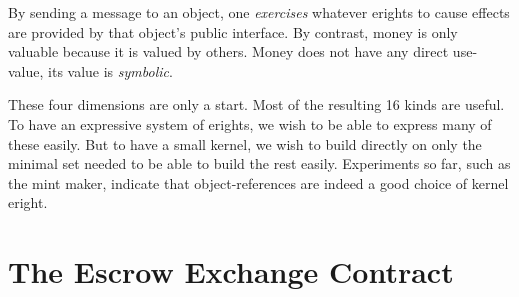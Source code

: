 \documentclass{llncs}
\begin{document}
By sending a message to an object, one \emph{exercises} whatever erights to cause effects are provided by that object's public interface. By contrast, money is only valuable because it is valued by others. Money does not have any direct use-value, its value is \emph{symbolic}.

These four dimensions are only a start. Most of the resulting 16 kinds are useful. To have an expressive system of erights, we wish to be able to express many of these easily. But to have a small kernel, we wish to build directly on only the minimal set needed to be able to build the rest easily. Experiments so far, such as the mint maker, indicate that object-references are indeed a good choice of kernel eright.


\section{The Escrow Exchange Contract}
\end{document}
